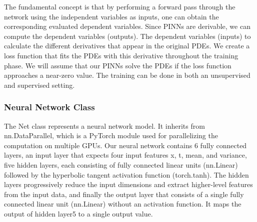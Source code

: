 \documentclass{article}
\begin{document}
The fundamental concept is that by performing a forward pass through the network using the independent variables as inputs, one can obtain the corresponding evaluated dependent variables.
Since PINNs are derivable, we can compute the dependent variables (outputs). The dependent variables (inputs) to calculate the different derivatives that appear in the original PDEs. We create a loss function that fits the PDEs with this derivative throughout the training phase. 
We will assume that our PINNs solve the PDEs if the loss function approaches a near-zero value. The training can be done in both an unsupervised and supervised setting.\\



\subsubsection{ Neural Network Class}

The Net class represents a neural network model. It inherits from nn.DataParallel, which is a PyTorch module used for parallelizing the computation on multiple GPUs.
Our neural network contains 6 fully connected layers, an input layer that expects four input features x, t, mean, and variance, five hidden layers, each consisting of fully connected linear units (nn.Linear) followed by the hyperbolic tangent activation function (torch.tanh). The hidden layers progressively reduce the input dimensions and extract higher-level features from the input data, 
and finally the output layer that consists of a single fully connected linear unit (nn.Linear) without an activation function. It maps the output of hidden layer5 to a single output value.
\end{document}

